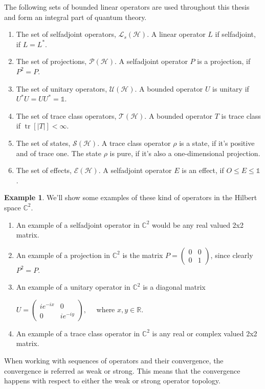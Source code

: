 \documentclass[a4paper,12pt]{wihuri}
\theoremstyle{definition}
\newtheorem{example}{Example}
\numberwithin{definition}{section}
\numberwithin{example}{section}
\numberwithin{theorem}{section}
\numberwithin{proposition}{section}
\numberwithin{lemma}{section}
\newcommand{\hi}{\mathcal{H}}%
\newcommand{\tc}{\mathcal{T}}%
\newcommand{\tila}{\mathcal{S}}%
\newcommand{\effect}{\mathcal{E}}%
\newcommand{\selfadj}{\mathcal{L}_{s}}%
\newcommand{\projection}{\mathcal{P}}%
\newcommand{\unitary}{\mathcal{U}}
\newcommand{\id}{\mathds{1}}
\newcommand{\cc}{\mathbb{C}^2}%
\newcommand{\real}{\mathbb{R}}%
\DeclareMathOperator{\tr}{tr}
\begin{document}
The following sets of bounded linear operators are used throughout this thesis and form an integral part of quantum theory.
\begin{enumerate}[$\bullet$]
\item The set of selfadjoint operators, $\selfadj(\hi)$. A linear operator $L$ if selfadjoint, if $L = L^*$.
\item The set of projections, $\projection(\hi)$. A selfadjoint operator $P$ is a projection, if $P^2=P$.
\item The set of unitary operators, $\unitary(\hi)$. A bounded operator $U$ is unitary if $U^*U = UU^* = \id$.
\item The set of trace class operators, $\tc(\hi)$. A bounded operator $T$ is trace class if $\tr[|T|] < \infty$.
\item The set of states, $\tila(\hi)$. A trace class operator $\rho$ is a state, if it's positive and of trace one. The state $\rho$ is pure, if it's also a one-dimensional projection.
\item The set of effects, $\effect(\hi)$. A selfadjoint operator $E$ is an effect, if $O \leq E \leq \id$.
\end{enumerate}
\begin{example}
We'll show some examples of these kind of operators in the Hilbert space $\cc$.

\begin{enumerate}[$\bullet$]
\item An example of a selfadjoint operator in $\cc$ would be any real valued 2x2 matrix.
\item An example of a projection in $\cc$ is the matrix 
$P=\begin{pmatrix}
0 & 0 \\
0 & 1
\end{pmatrix}$, since clearly $P^2 = P$.
\item An example of a unitary operator in $\cc$ is a diagonal matrix 

$U = \begin{pmatrix}
ie^{-ix}& 0 \\
0 & ie^{-iy}
\end{pmatrix},\quad$ where $x,y \in \real$.
\item An example of a trace class operator in $\cc$ is any real or complex valued 2x2 matrix.
\end{enumerate}
\end{example}


When working with sequences of operators and their convergence, the convergence is referred as weak or strong. This means that the convergence happens with respect to either the weak or strong operator topology.
\end{document}
